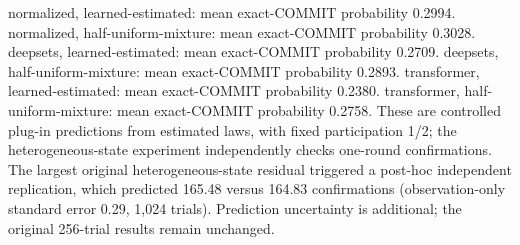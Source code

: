 normalized, learned-estimated: mean exact-COMMIT probability 0.2994. normalized, half-uniform-mixture: mean exact-COMMIT probability 0.3028. deepsets, learned-estimated: mean exact-COMMIT probability 0.2709. deepsets, half-uniform-mixture: mean exact-COMMIT probability 0.2893. transformer, learned-estimated: mean exact-COMMIT probability 0.2380. transformer, half-uniform-mixture: mean exact-COMMIT probability 0.2758. These are controlled plug-in predictions from estimated laws, with fixed participation 1/2; the heterogeneous-state experiment independently checks one-round confirmations. The largest original heterogeneous-state residual triggered a post-hoc independent replication, which predicted 165.48 versus 164.83 confirmations (observation-only standard error 0.29, 1,024 trials). Prediction uncertainty is additional; the original 256-trial results remain unchanged.
